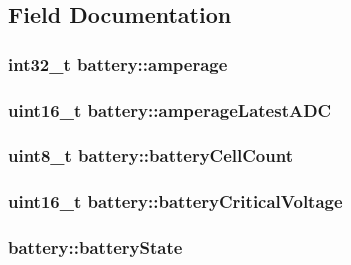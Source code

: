\subsection{Field Documentation}
\hypertarget{structbattery_a1bc76d30de02dab8edd0e9b57ae3c82d}{
\subsubsection[{amperage}]{\setlength{\rightskip}{0pt plus 5cm}int32\+\_\+t battery\+::amperage}}\label{structbattery_a1bc76d30de02dab8edd0e9b57ae3c82d}
\hypertarget{structbattery_a9d47c19d6c15d9c95a0149dbb811daa6}{
\subsubsection[{amperage\+Latest\+A\+D\+C}]{\setlength{\rightskip}{0pt plus 5cm}uint16\+\_\+t battery\+::amperage\+Latest\+A\+D\+C}}\label{structbattery_a9d47c19d6c15d9c95a0149dbb811daa6}
\hypertarget{structbattery_abcfd05fa6169eb831a83b48645db55ef}{
\subsubsection[{battery\+Cell\+Count}]{\setlength{\rightskip}{0pt plus 5cm}uint8\+\_\+t battery\+::battery\+Cell\+Count}}\label{structbattery_abcfd05fa6169eb831a83b48645db55ef}
\hypertarget{structbattery_a043a48525048254907b283ae22e189a2}{
\subsubsection[{battery\+Critical\+Voltage}]{\setlength{\rightskip}{0pt plus 5cm}uint16\+\_\+t battery\+::battery\+Critical\+Voltage}}\label{structbattery_a043a48525048254907b283ae22e189a2}
\hypertarget{structbattery_a77bcb24cd987fedec154e1a26c35bb20}{
\subsubsection[{battery\+State}]{ battery\+::battery\+State}}\label{structbattery_a77bcb24cd987fedec154e1a26c35bb20}
